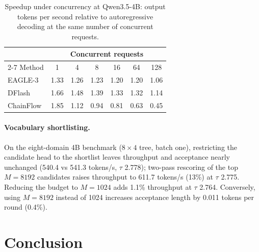 \documentclass{article}
\newcommand{\Sys}{ChainFlow\xspace}
\newcommand{\TargetFamily}{Qwen3.5\xspace}          %
\newcommand{\TopM}{8192}                     %
\begin{document}
\begin{table}[!htbp]
\centering\small
\setlength{\tabcolsep}{2.5pt}
\caption{Speedup under concurrency at \TargetFamily-4B: output tokens per second relative to autoregressive decoding at the same number of concurrent requests.}
\label{tab:serving}
\vskip 0.1in
\begin{tabular}{lcccccc}
\toprule
 & \multicolumn{6}{c}{Concurrent requests} \\
\cmidrule(lr){2-7}
Method & 1 & 4 & 8 & 16 & 64 & 128 \\
\midrule
EAGLE-3 & 1.33 & 1.26 & 1.23 & 1.20 & 1.20 & 1.06 \\
DFlash & 1.66 & 1.48 & 1.39 & 1.33 & 1.32 & 1.14 \\
\midrule
\Sys{} & 1.85 & 1.12 & 0.94 & 0.81 & 0.63 & 0.45 \\
\bottomrule
\end{tabular}


\end{table}

\paragraph{Vocabulary shortlisting.}
On the eight-domain 4B benchmark ($8\times4$ tree, batch one), restricting the candidate head to the
shortlist leaves throughput and acceptance nearly unchanged (540.4 vs 541.3 tokens/s, $\tau$ 2.778);
two-pass rescoring of the top $M=\TopM$ candidates raises throughput to 611.7 tokens/s
(13\%) at $\tau$ 2.775. Reducing the budget to $M=1024$ adds
1.1\% throughput at $\tau$ 2.764. Conversely, using $M=\TopM$
instead of 1024 increases acceptance length by 0.011 tokens per round
(0.4\%).

\section{Conclusion}
\label{sec:conclusion}
\end{document}

